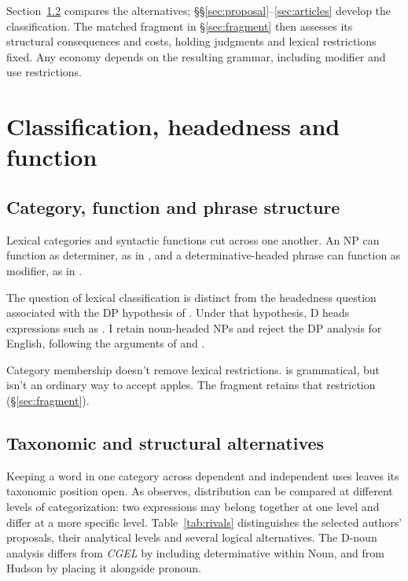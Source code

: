 \documentclass[12pt]{article}
\begin{document}
Section~\ref{sec:related} compares the alternatives; §§\ref{sec:proposal}--\ref{sec:articles} develop the classification. The matched fragment in §\ref{sec:fragment} then assesses its structural consequences and costs, holding judgments and lexical restrictions fixed. Any economy depends on the resulting grammar, including modifier and use restrictions.

\section{Classification, headedness and function}\label{sec:alternatives}

\subsection{Category, function and phrase structure}\label{sec:category-function}

Lexical categories and syntactic functions cut across one another. An NP can function as determiner, as in , and a determinative-headed phrase can function as modifier, as in  \citep{payne2010,pullummiller2022nps}.

The question of lexical classification is distinct from the headedness question associated with the DP hypothesis of \textcite{abney1987}. Under that hypothesis, D heads expressions such as . I retain noun-headed NPs and reject the DP analysis for English, following the arguments of \textcite{pullummiller2022nps} and \textcite{bruening2020nominal}.

Category membership doesn't remove lexical restrictions.  is grammatical, but  isn't an ordinary way to accept apples. The fragment retains that restriction (§\ref{sec:fragment}).

\subsection{Taxonomic and structural alternatives}\label{sec:related}

Keeping a word in one category across dependent and independent uses leaves its taxonomic position open. As \textcite[232--235]{lyons1968} observes, distribution can be compared at different levels of categorization: two expressions may belong together at one level and differ at a more specific level. Table~\ref{tab:rivals} distinguishes the selected authors' proposals, their analytical levels and several logical alternatives. The D-noun analysis differs from \textit{CGEL} by including determinative within Noun, and from Hudson by placing it alongside pronoun.
\end{document}
